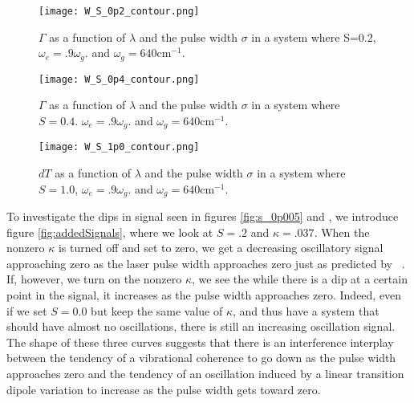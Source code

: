 \begin{figure}
   \texttt{[image: W\_S\_0p2\_contour.png]}
   \caption{$\Gamma$ as a function of $\lambda$ and the pulse width $\sigma$ in a system where S=0.2, $\omega_e = .9 \omega_g$. and $\omega_g = 640 \text{cm}^{-1}$.  }
	\label{fig:s_0p2}
\end{figure}

\begin{figure}
   \texttt{[image: W\_S\_0p4\_contour.png]}
   \caption{$\Gamma$ as a function of $\lambda$ and the pulse width $\sigma$ in a system where $S=0.4$. $\omega_e = .9 \omega_g$. and $\omega_g = 640 \text{cm}^{-1}$.}
	\label{fig:s_0p4}
\end{figure}

\begin{figure}
   \texttt{[image: W\_S\_1p0\_contour.png]}
   \caption{$dT$ as a function of $\lambda$ and the pulse width $\sigma$ in a system where $S=1.0$, $\omega_e = .9 \omega_g$. and $\omega_g = 640 \text{cm}^{-1}$. }
	\label{fig:s_1p0}
\end{figure}

To investigate the dips in signal seen in figures \ref{fig:s_0p005} and \label{fig:s_0p2}, we introduce figure \ref{fig:addedSignals}, where we look at $S=.2$ and $\kappa=.037$.   When the nonzero $\kappa$ is turned off and set to zero, we get a decreasing oscillatory signal approaching zero as the laser pulse width approaches zero just as predicted by ~\cite{allanWitness}.  If, however, we turn on the nonzero $\kappa$, we see the while there is a dip at a certain point in the signal, it increases as the pulse width approaches zero.  Indeed, even if we set $S=0.0$ but keep the same value of $\kappa$, and thus have a system that should have almost no oscillations, there is still an increasing oscillation signal.  The shape of these three curves suggests that there is an interference interplay between the tendency of a vibrational coherence to go down as the pulse width approaches zero and the tendency of an oscillation induced by a linear transition dipole variation to increase as the pulse width gets toward zero.

